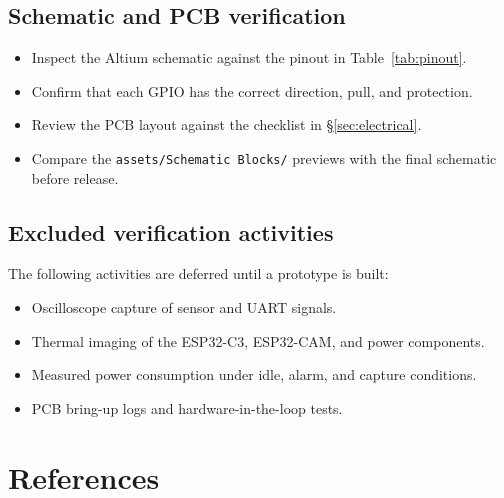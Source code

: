 \documentclass[11pt,a4paper]{article}
\begin{document}
\subsection{Schematic and PCB verification}

\begin{itemize}
    \item Inspect the Altium schematic against the pinout in Table~\ref{tab:pinout}.
    \item Confirm that each GPIO has the correct direction, pull, and protection.
    \item Review the PCB layout against the checklist in \S\ref{sec:electrical}.
    \item Compare the \texttt{assets/Schematic Blocks/} previews with the final schematic before release.
\end{itemize}

\subsection{Excluded verification activities}

The following activities are deferred until a prototype is built:

\begin{itemize}
    \item Oscilloscope capture of sensor and UART signals.
    \item Thermal imaging of the ESP32-C3, ESP32-CAM, and power components.
    \item Measured power consumption under idle, alarm, and capture conditions.
    \item PCB bring-up logs and hardware-in-the-loop tests.
\end{itemize}

\section{References}
\end{document}
